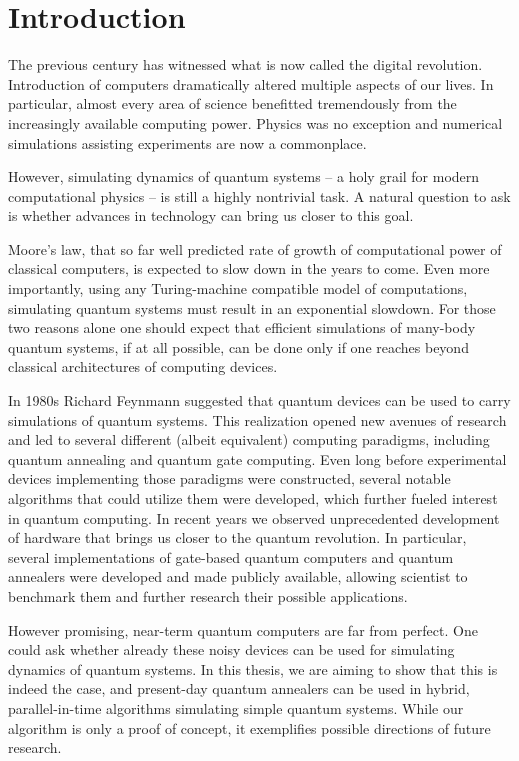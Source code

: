 \chapter*{Introduction}
The previous century has witnessed what is now called the digital revolution. Introduction of computers dramatically altered multiple aspects of our lives. In particular, almost every area of science benefitted tremendously from the increasingly available computing power. Physics was no exception and numerical simulations assisting experiments are now a commonplace.

However, simulating dynamics of quantum systems -- a holy grail for modern computational physics -- is still a highly nontrivial task. A natural question to ask is whether advances in technology can bring us closer to this goal.


Moore's law, that so far well predicted rate of growth of computational power of classical computers, is expected to slow down in the years to come. Even more importantly, using any Turing-machine compatible model of computations, simulating quantum systems must result in an exponential slowdown. For those two reasons alone one should expect that efficient simulations of many-body quantum systems, if at all possible, can be done only if one reaches beyond classical architectures of computing devices.

In 1980s Richard Feynmann suggested that quantum devices can be used to carry simulations of quantum systems. This realization opened new avenues of research and led to several different (albeit equivalent) computing paradigms, including quantum annealing and quantum gate computing. Even long before experimental devices implementing those paradigms were constructed, several notable algorithms that could utilize them were developed, which further fueled interest in quantum computing. In recent years we observed unprecedented development of hardware that brings us closer to the quantum revolution. In particular, several implementations of gate-based quantum computers and quantum annealers were developed and made publicly available, allowing scientist to benchmark them and further research their possible applications.

However promising, near-term quantum computers are far from perfect. One could ask whether already these noisy devices can be used for simulating dynamics of quantum systems. In this thesis, we are aiming to show that this is indeed the case, and present-day quantum annealers can be used in hybrid, parallel-in-time algorithms simulating simple quantum systems. While our algorithm is only a proof of concept, it exemplifies possible directions of future research.

